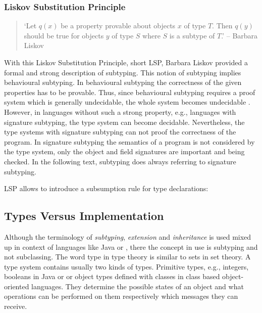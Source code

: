 \subsubsection{Liskov Substitution Principle}
\begin{quotation}
`Let $q(x)$ be a property provable about objects $x$ of type $T$. Then
$q(y)$ should be true for objects $y$ of type $S$ where $S$ is a subtype
of $T$.' -- Barbara Liskov \cite{liskov_behavioral_2001}
\end{quotation}

With this Liskov Substitution Principle, short LSP, Barbara Liskov
provided a formal and strong description  of subtyping. This
notion of subtyping implies behavioural subtyping. In behavioural
subtyping the correctness of the given properties has to be
provable. Thus, since behavioural subtyping requires a proof system
which is generally undecidable, the whole system becomes undecidable
\cite{poll_behavioural_1998}. However, in languages without such a strong
property, e.g., languages with signature subtyping, the type system can
become decidable. Nevertheless, the type systems with signature subtyping
can not proof the correctness of the program. In signature subtyping
the semantics of a program is not considered by the type system, only
the object and field signatures are important and being checked.  In the
following text, subtyping does always referring to signature subtyping.

LSP allows to introduce a subsumption rule for type declarations:

\begin{defn}[Subsumption]
\label{def:subsumption}
	\begin{mathpar}
	\end{mathpar}
\end{defn}

\subsection{Types Versus Implementation}
\label{sec:sharingTypes}
Although the terminology of \emph{subtyping}, \emph{extension} and
\emph{inheritance} is used mixed up in context of languages like Java
or \cpp, there the concept in use is subtyping and not subclassing.
The word type in type theory is similar to sets in set theory. A
type system contains usually two kinds of types. Primitive types,
e.g., integers, booleans in Java or \cpp or object types defined with
classes in class based object-oriented languages. They determine the
possible states of an object and what operations can be performed on them
respectively which messages they can receive.

